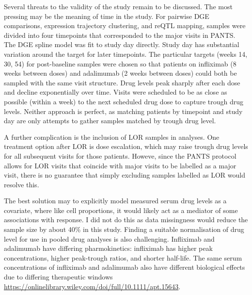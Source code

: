 Several threats to the validity of the study remain to be discussed.
The most pressing may be the meaning of time in the study.
For pairwise \gls{DGE} comparisons, expression trajectory clustering, and \gls{reQTL} mapping, 
samples were divided into four timepoints that corresponded to the major visits in \gls{PANTS}.
The \gls{DGE} spline model was fit to study day directly.
Study day has substantial variation around the target for later timepoints.
The particular targets (weeks 14, 30, 54) for post-baseline samples were chosen so that patients on infliximab (8 weeks between doses) and adalimumab (2 weeks between doses) could both be sampled with the same visit structure.
Drug levels peak sharply after each dose and decline exponentially over time.
Visits were scheduled to be as close as possible (within a week) to the next scheduled drug dose to capture trough drug levels.
Neither approach is perfect, as matching patients by timepoint and study day are only attempts to gather samples matched by trough drug level.

A further complication is the inclusion of \gls{LOR} samples in analyses.
One treatment option after \gls{LOR} is dose escalation, which may raise trough drug levels for all subsequent visits for those patients.
Howeve, since the \gls{PANTS} protocol allows for \gls{LOR} visits that coincide with major visits to be labelled as a major visit,
there is no guarantee that simply excluding samples labelled as \gls{LOR} would resolve this.

The best solution may to explicitly model measured serum drug levels as a covariate, where like cell proportions, it would likely act as a mediator of some associations with response.
I did not do this as data missingness would reduce the sample size by about 40\% in this study.
Finding a suitable normalisation of drug level for use in pooled drug analyses is also challenging.
Infliximab and adalimumab have differing pharmokinetics: infliximab has higher peak concentrations, higher peak-trough ratios, and shorter half-life.
The same serum concentrations of infliximab and adalimumab also have different biological effects due to differing therapeutic windows
 \autocite{tracey2008TumorNecrosisFactor,lichtenstein2013ComprehensiveReviewAntitumor} \url{https://onlinelibrary.wiley.com/doi/full/10.1111/apt.15643}.

